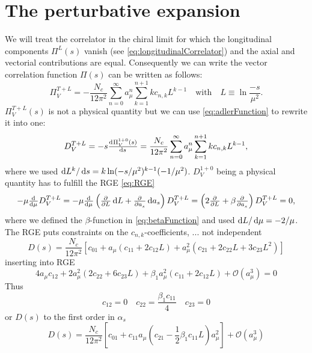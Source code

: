 \documentclass[../../index.tex]{subfiles}
\begin{document}
\section{The perturbative expansion}
We will treat the correlator in the chiral limit for which the longitudinal
components $\Pi^{L}(s)$ vanish (see \cref{eq:longitudinalCorrelator}) and the
axial and vectorial contributions are equal. Consequently \cite{Beneke2008} we
can write the vector correlation function $\Pi(s)$ can be written as follows:
\begin{equation}
  \Pi_V^{T+L} = - \frac{N_c}{12 \pi^2} \sum_{n=0}^\infty a_\mu^n \sum_{k=1}^{n+1} k c_{n,k} L^{k-1} \quad \text{with} \quad L \equiv \ln \frac{-s}{\mu^2}.
\end{equation}
$\Pi_V^{T+L}(s)$ is not a physical quantity but we can use
\cref{eq:adlerFunction} to rewrite it into one:
\begin{equation}
  D_V^{T+L} = - s \od{\Pi_V^{1+0}(s)}{s} = \frac{N_c}{12 \pi^2} \sum_{n=0}^\infty a_\mu^n \sum_{k=1}^{n+1} k c_{n,k} L^{k-1},
\end{equation}
where we used $\dif L^k/ \dif s=k\ln(-s/\mu^2)^{k-1}(-1/\mu^2)$. $D_V^{1+0}$
being a physical quantity has to fulfill the RGE \cref{eq:RGE}
\begin{equation}
  -\mu \od{}{\mu} D_V^{T+L} = -\mu \od{}{\mu} \left( \pd{}{L} \dif L + \pd{}{a_s} \dif a_s \right) D_V^{T+L}
  = \left( 2\pd{}{L} + \beta \pd{}{a_s} \right) D_V^{T+L} = 0,
\end{equation}
where we defined the $\beta$-function in \cref{eq:betaFunction} and used $\dif L
/ \dif \mu = - 2/ \mu$. The RGE puts constraints on the $c_{n, k}$-coefficients,
... not independent
\begin{equation}
  D(s) = \frac{N_c}{12 \pi^2} \left[ c_{01} + a_\mu(c_{11} + 2 c_{12} L) + a_\mu^2(c_{21} + 2 c_{22} L + 3 c_{23} L^2) \right]
\end{equation}
inserting into RGE
\begin{equation}
  4 a_\mu c_{12} + 2 a_\mu^2(2 c_{22} + 6 c_{23} L) + \beta_1 a_\mu^2(c_{11} + 2 c_{12}L) + \mathcal{O}(a_\mu^3) = 0
\end{equation}
Thus
\begin{equation}
  c_{12} = 0 \quad c_{22} = \frac{\beta_1 c_{11}}{4} \quad c_{23} = 0
\end{equation}
or $D(s)$ to the first order in $\alpha_s$
\begin{equation}
  D(s) = \frac{N_c}{12 \pi^2} \left[ c_{01} + c_{11} a_\mu \left( c_{21} - \frac{1}{2} \beta_1 c_{11} L  \right) a_\mu^2 \right] + \mathcal{O}(a_\mu^3)
\end{equation}
\end{document}
